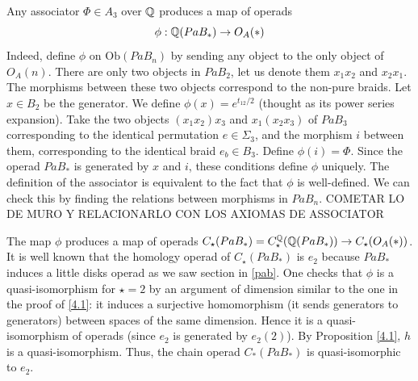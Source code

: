 \documentclass[TFM.tex]{subfiles}
\begin{document}
Any associator $\Phi\in A_3$ over $\mathbb{Q}$ produces a map of operads
\[
\phi:\mathbb{Q}(PaB_*)\to O_A(*)
\]
Indeed, define $\phi$ on $\mathrm{Ob}(PaB_n)$ by sending any object to the only object of $O_A(n)$.
There are only two objects in $PaB_2$, let us denote them $x_1x_2$ and $x_2x_1$. The morphisms
between these two objects correspond to the non-pure braids. Let $x\in B_2$
be the generator. We define $\phi(x)=e^{t_{12}/2}$ (thought as its power series expansion). Take the two objects $(x_1x_2)x_3$ and
$x_1(x_2x_3)$ of $PaB_3$ corresponding to the identical permutation $e \in \Sigma_3$, and the morphism
$i$ between them, corresponding to the identical braid $e_b\in B_3$. Define $\phi(i)=\Phi$.
Since the operad $PaB_*$ is generated by $x$ and $i$, these conditions define $\phi$ uniquely. %
The definition of the associator is equivalent to the fact that $\phi$ is well-defined. We can check this by finding the relations between morphisms in $PaB_n$. COMETAR LO DE MURO Y RELACIONARLO CON LOS AXIOMAS DE ASSOCIATOR

The map $\phi$ produces a map of operads $C_\star(PaB_*)=C_\star^{\mathbb{Q}}(\mathbb{Q}(PaB_*))\to C_\star(O_A(*))$.
It is well known that the homology operad of $C_\star(PaB_*)$ is $e_2$ because $PaB_*$ induces a little disks operad as we saw section in \ref{pab}. One checks that $\phi$ is a quasi-isomorphism for $\star=2$ by an argument of dimension similar to the one in the proof of \ref{4.1}: it induces a surjective homomorphism (it sends generators to generators) between spaces of the same dimension. Hence it is a quasi-isomorphism of operads (since
$e_2$ is generated by $e_2(2)$). By Proposition \ref{4.1}, $h$ is a quasi-isomorphism. Thus, the
chain operad $C_*(PaB_*)$ is quasi-isomorphic to $e_2$.



\end{document}
